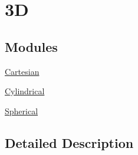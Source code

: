 \hypertarget{group___e_g_x_math-_conversions-_coordinate_conversions-3_d}{}\section{3D}
\label{group___e_g_x_math-_conversions-_coordinate_conversions-3_d}
\subsection*{Modules}
\begin{DoxyCompactItemize}
\item 
\mbox{\hyperlink{group___e_g_x_math-_conversions-_coordinate_conversions-3_d-_cartesian}{Cartesian}}
\item 
\mbox{\hyperlink{group___e_g_x_math-_conversions-_coordinate_conversions-3_d-_cylindrical}{Cylindrical}}
\item 
\mbox{\hyperlink{group___e_g_x_math-_conversions-_coordinate_conversions-3_d-_spherical}{Spherical}}
\end{DoxyCompactItemize}


\subsection{Detailed Description}
